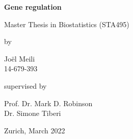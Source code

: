 \renewcommand\familydefault{\sfdefault} 


\thispagestyle{empty}
\renewcommand{\baselinestretch}{1.5}\normalfont
\begin{center}
\setlength{\parindent}{0cm}
\bf\Large%
Gene regulation \\

\normalfont



\hrulefill

\vspace*{4cm}

\large
Master Thesis in Biostatistics (STA495) %
\vspace*{12mm}

by

\vspace*{12mm}

Jo\"el Meili \\
\small 14-679-393 \\
\normalfont
\vspace*{4cm}

supervised by

\vspace*{1cm}

Prof. Dr. Mark D. Robinson \\
Dr. Simone Tiberi

\vfill

Zurich, March 2022
\end{center}
\renewcommand\familydefault{\rmdefault}%
\renewcommand{\baselinestretch}{1.0}\rm 
\setcounter{page}{0}
\newpage
\vspace*{12cm}~\thispagestyle{empty}
\newpage
